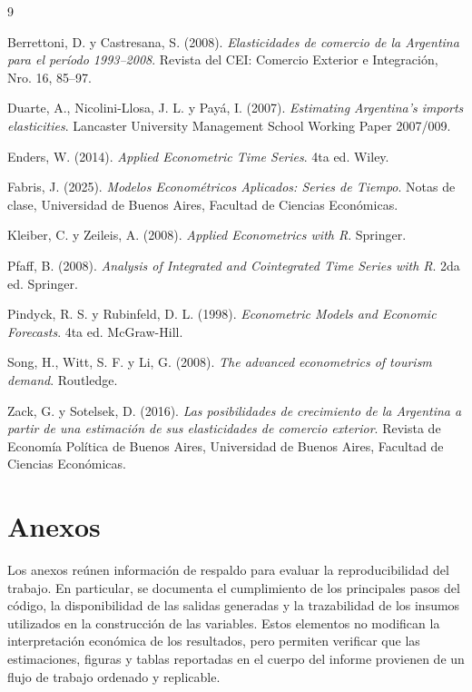 \documentclass[11pt]{article}
\begin{document}
\begin{thebibliography}{9}

Berrettoni, D. y Castresana, S. (2008).
\textit{Elasticidades de comercio de la Argentina para el período 1993--2008}.
Revista del CEI: Comercio Exterior e Integración, Nro. 16, 85--97.

Duarte, A., Nicolini-Llosa, J. L. y Payá, I. (2007).
\textit{Estimating Argentina's imports elasticities}.
Lancaster University Management School Working Paper 2007/009.

Enders, W. (2014).
\textit{Applied Econometric Time Series}.
4ta ed. Wiley.

Fabris, J. (2025).
\textit{Modelos Econométricos Aplicados: Series de Tiempo}.
Notas de clase, Universidad de Buenos Aires, Facultad de Ciencias Económicas.

Kleiber, C. y Zeileis, A. (2008).
\textit{Applied Econometrics with R}.
Springer.

Pfaff, B. (2008).
\textit{Analysis of Integrated and Cointegrated Time Series with R}.
2da ed. Springer.

Pindyck, R. S. y Rubinfeld, D. L. (1998).
\textit{Econometric Models and Economic Forecasts}.
4ta ed. McGraw-Hill.

Song, H., Witt, S. F. y Li, G. (2008).
\textit{The advanced econometrics of tourism demand}.
Routledge.

Zack, G. y Sotelsek, D. (2016).
\textit{Las posibilidades de crecimiento de la Argentina a partir de una estimación de sus elasticidades de comercio exterior}.
Revista de Economía Política de Buenos Aires, Universidad de Buenos Aires,
Facultad de Ciencias Económicas.



\end{thebibliography}


\appendix
\section{Anexos}
\label{sec:anexos}

Los anexos reúnen información de respaldo para evaluar la reproducibilidad del
trabajo. En particular, se documenta el cumplimiento de los principales pasos
del código, la disponibilidad de las salidas generadas y la trazabilidad de los
insumos utilizados en la construcción de las variables. Estos elementos no
modifican la interpretación económica de los resultados, pero permiten verificar
que las estimaciones, figuras y tablas reportadas en el cuerpo del informe
provienen de un flujo de trabajo ordenado y replicable.
\end{document}
